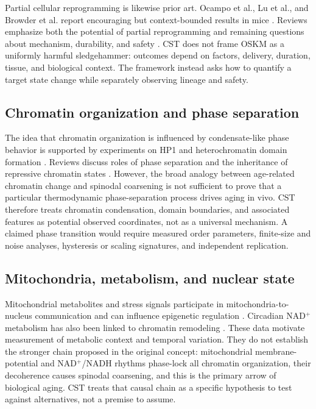 \documentclass[11pt,a4paper]{article}
\theoremstyle{definition}
\theoremstyle{remark}
\begin{document}
Partial cellular reprogramming is likewise prior art. Ocampo et al., Lu et al., and Browder et al. report encouraging but context-bounded results in mice \cite{Ocampo2016,Lu2020,Browder2022}. Reviews emphasize both the potential of partial reprogramming and remaining questions about mechanism, durability, and safety \cite{Avelar2025,LongWinding2024}. CST does not frame OSKM as a uniformly harmful sledgehammer: outcomes depend on factors, delivery, duration, tissue, and biological context. The framework instead asks how to quantify a target state change while separately observing lineage and safety.

\subsection{Chromatin organization and phase separation}
The idea that chromatin organization is influenced by condensate-like phase behavior is supported by experiments on HP1 and heterochromatin domain formation \cite{Larson2017,Strom2017}. Reviews discuss roles of phase separation and the inheritance of repressive chromatin states \cite{Akilli2024,LLPSAging2024}. However, the broad analogy between age-related chromatin change and spinodal coarsening is not sufficient to prove that a particular thermodynamic phase-separation process drives aging in vivo. CST therefore treats chromatin condensation, domain boundaries, and associated features as potential observed coordinates, not as a universal mechanism. A claimed phase transition would require measured order parameters, finite-size and noise analyses, hysteresis or scaling signatures, and independent replication.

\subsection{Mitochondria, metabolism, and nuclear state}
Mitochondrial metabolites and stress signals participate in mitochondria-to-nucleus communication and can influence epigenetic regulation \cite{Zhu2022}. Circadian NAD$^+$ metabolism has also been linked to chromatin remodeling \cite{NADChromatin2016}. These data motivate measurement of metabolic context and temporal variation. They do not establish the stronger chain proposed in the original concept: mitochondrial membrane-potential and NAD$^+$/NADH rhythms phase-lock all chromatin organization, their decoherence causes spinodal coarsening, and this is the primary arrow of biological aging. CST treats that causal chain as a specific hypothesis to test against alternatives, not a premise to assume.
\end{document}
